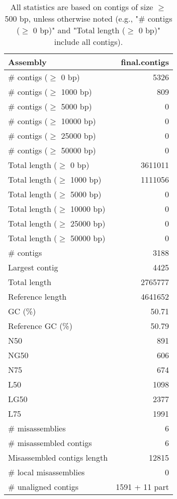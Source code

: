 \documentclass[12pt,a4paper]{article}
\begin{document}
\begin{table}[ht]
\begin{center}
\caption{All statistics are based on contigs of size $\geq$ 500 bp, unless otherwise noted (e.g., "\# contigs ($\geq$ 0 bp)" and "Total length ($\geq$ 0 bp)" include all contigs).}
\begin{tabular}{|l*{1}{|r}|}
\hline
Assembly & final.contigs \\ \hline
\# contigs ($\geq$ 0 bp) & 5326 \\ \hline
\# contigs ($\geq$ 1000 bp) & 809 \\ \hline
\# contigs ($\geq$ 5000 bp) & 0 \\ \hline
\# contigs ($\geq$ 10000 bp) & 0 \\ \hline
\# contigs ($\geq$ 25000 bp) & 0 \\ \hline
\# contigs ($\geq$ 50000 bp) & 0 \\ \hline
Total length ($\geq$ 0 bp) & 3611011 \\ \hline
Total length ($\geq$ 1000 bp) & 1111056 \\ \hline
Total length ($\geq$ 5000 bp) & 0 \\ \hline
Total length ($\geq$ 10000 bp) & 0 \\ \hline
Total length ($\geq$ 25000 bp) & 0 \\ \hline
Total length ($\geq$ 50000 bp) & 0 \\ \hline
\# contigs & 3188 \\ \hline
Largest contig & 4425 \\ \hline
Total length & 2765777 \\ \hline
Reference length & 4641652 \\ \hline
GC (\%) & 50.71 \\ \hline
Reference GC (\%) & 50.79 \\ \hline
N50 & 891 \\ \hline
NG50 & 606 \\ \hline
N75 & 674 \\ \hline
L50 & 1098 \\ \hline
LG50 & 2377 \\ \hline
L75 & 1991 \\ \hline
\# misassemblies & 6 \\ \hline
\# misassembled contigs & 6 \\ \hline
Misassembled contigs length & 12815 \\ \hline
\# local misassemblies & 0 \\ \hline
\# unaligned contigs & 1591 + 11 part \\ \hline

\end{tabular}
\end{center}
\end{table}
\end{document}
